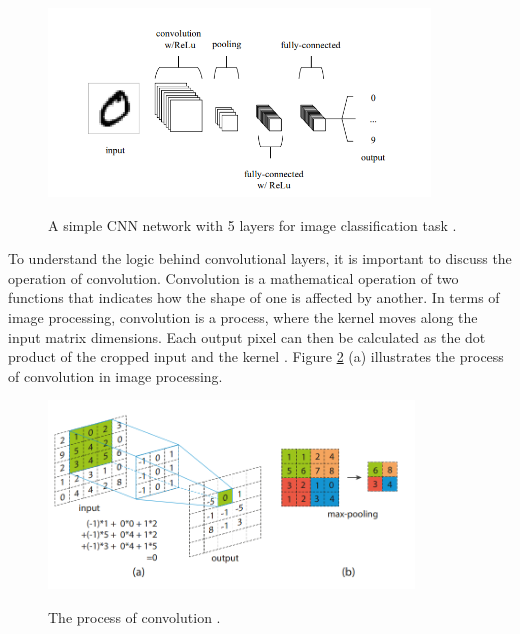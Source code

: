 \begin{figure}[htb]
	\begin{center}
		\includegraphics[height=5cm]{./CNN.png}
	\end{center}
	\caption{A simple CNN network with 5 layers for image classification task \cite{Mahony2019}.}
	\begin{center}
		\label{CNN}
	\end{center}
\end{figure}

To understand the logic behind convolutional layers, it is important to discuss the operation of convolution. Convolution is a mathematical operation of two functions that indicates how the shape of one is affected by another. In terms of image processing, convolution is a process, where the kernel moves along the input matrix dimensions. Each output pixel can then be calculated as the dot product of the cropped input and the kernel \cite{Liu2016}. Figure \ref{CNN_1} (a) illustrates the process of convolution in image processing.  
\begin{figure}[htb]
	\begin{center}
		\includegraphics[height=5cm]{./CNN_1.png}
	\end{center}
	\caption{The process of convolution \cite{Liu2016}.}
	\begin{center}
		\label{CNN_1}
	\end{center}
\end{figure}


